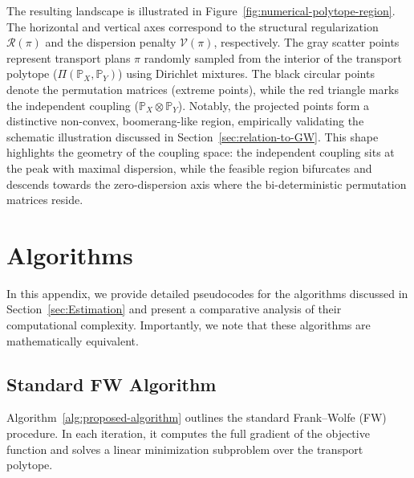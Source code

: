 \documentclass{article}
\theoremstyle{plain}
\theoremstyle{definition}
\theoremstyle{remark}
\begin{document}
The resulting landscape is illustrated in Figure~\ref{fig:numerical-polytope-region}. The horizontal and vertical axes correspond to the structural regularization $\mathcal{R}(\pi)$ and the dispersion penalty $\mathcal{V}(\pi)$, respectively. The gray scatter points represent transport plans $\pi$ randomly sampled from the interior of the transport polytope ($\Pi(\mathbb{P}_X,\mathbb{P}_Y)$) using Dirichlet mixtures. The black circular points denote the permutation matrices (extreme points), while the red triangle marks the independent coupling ($\mathbb{P}_X \otimes \mathbb{P}_Y$). Notably, the projected points form a distinctive non-convex, boomerang-like region, empirically validating the schematic illustration discussed in Section~\ref{sec:relation-to-GW}. This shape highlights the geometry of the coupling space: the independent coupling sits at the peak with maximal dispersion, while the feasible region bifurcates and descends towards the zero-dispersion axis where the bi-deterministic permutation matrices reside.

\section{Algorithms}\label{App:algorithms}
In this appendix, we provide detailed pseudocodes for the algorithms discussed in Section~\ref{sec:Estimation} and present a comparative analysis of their computational complexity. Importantly, we note that these algorithms are mathematically equivalent.

\subsection{Standard FW Algorithm}
Algorithm~\ref{alg:proposed-algorithm} outlines the standard Frank--Wolfe (FW) procedure. In each iteration, it computes the full gradient of the objective function and solves a linear minimization subproblem over the transport polytope.
\end{document}
